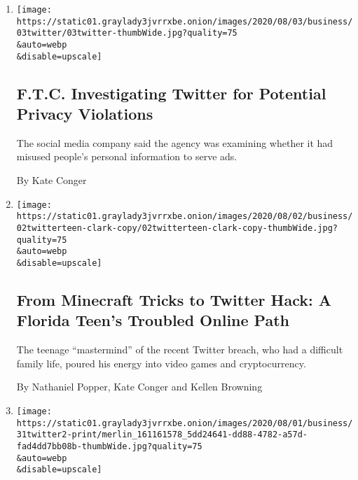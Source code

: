 \begin{enumerate}
\def\labelenumi{\arabic{enumi}.}
\item
  \href{/2020/08/03/technology/ftc-twitter-privacy-violations.html}{}

  \texttt{[image: https://static01.graylady3jvrrxbe.onion/images/2020/08/03/business/03twitter/03twitter-thumbWide.jpg?quality=75\\\&auto=webp\\\&disable=upscale]}

  \hypertarget{ftc-investigating-twitter-for-potential-privacy-violations}{%
  \subsection{F.T.C. Investigating Twitter for Potential Privacy
  Violations}\label{ftc-investigating-twitter-for-potential-privacy-violations}}

  The social media company said the agency was examining whether it had
  misused people's personal information to serve ads.

  By Kate Conger
\item
  \href{/2020/08/02/technology/florida-teenager-twitter-hack.html}{}

  \texttt{[image: https://static01.graylady3jvrrxbe.onion/images/2020/08/02/business/02twitterteen-clark-copy/02twitterteen-clark-copy-thumbWide.jpg?quality=75\\\&auto=webp\\\&disable=upscale]}

  \hypertarget{from-minecraft-tricks-to-twitter-hack-a-florida-teens-troubled-online-path}{%
  \subsection{From Minecraft Tricks to Twitter Hack: A Florida Teen's
  Troubled Online
  Path}\label{from-minecraft-tricks-to-twitter-hack-a-florida-teens-troubled-online-path}}

  The teenage ``mastermind'' of the recent Twitter breach, who had a
  difficult family life, poured his energy into video games and
  cryptocurrency.

  By Nathaniel Popper, Kate Conger and Kellen Browning
\item
  \href{/2020/07/31/technology/twitter-hack-arrest.html}{}

  \texttt{[image: https://static01.graylady3jvrrxbe.onion/images/2020/08/01/business/31twitter2-print/merlin\_161161578\_5dd24641-dd88-4782-a57d-fad4dd7bb08b-thumbWide.jpg?quality=75\\\&auto=webp\\\&disable=upscale]}

  \hypertarget{florida-teenager-is-charged-as-mastermind-of-twitter-hack}{%
}
\end{enumerate}
